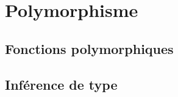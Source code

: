 \section{ Polymorphisme}
\label{sec:polymorphism}

\subsection{ Fonctions polymorphiques}

\subsection{ Inférence de type}
